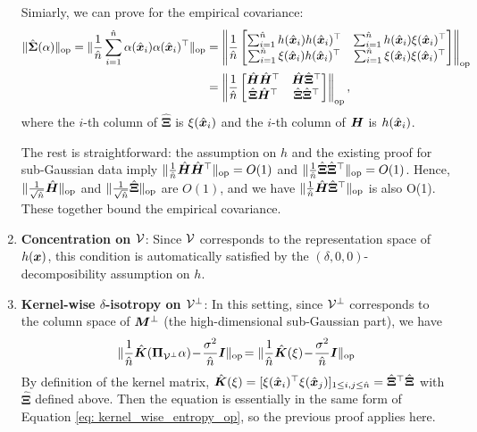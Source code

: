 \begin{enumerate}
        Simiarly, we can prove for the empirical covariance: 
        \begin{align*}
            \lVert \hat{{\bm{\Sigma}}}(\alpha) \rVert_{\mathrm{op}} = \lVert \frac{1}{\hat{n}} \sum_{i=1}^{\hat{n}}\alpha(\hat{{\bm{x}}}_i)\alpha(\hat{{\bm{x}}}_i)^\top  \rVert_{\mathrm{op}} & = \left\|\frac{1}{\hat{n}}\begin{bmatrix}
\sum_{i=1}^{\hat{n}}h(\hat{{\bm{x}}}_i)h(\hat{{\bm{x}}}_i)^\top & \sum_{i=1}^{\hat{n}}h(\hat{{\bm{x}}}_i)\xi(\hat{{\bm{x}}}_i)^\top \\ \sum_{i=1}^{\hat{n}}\xi(\hat{{\bm{x}}}_i)h(\hat{{\bm{x}}}_i)^\top & \sum_{i=1}^{\hat{n}}\xi(\hat{{\bm{x}}}_i)\xi(\hat{{\bm{x}}}_i)^\top
            \end{bmatrix}\right\|_{\text{op}} \\
            & = \left\|\frac{1}{\hat{n}}\begin{bmatrix}
\hat{{\bm{H}}}\hat{{\bm{H}}}^\top & \hat{{\bm{H}}}\hat{\mathbf{\Xi}}^\top \\ \hat{\mathbf{\Xi}}\hat{{\bm{H}}}^\top & \hat{\mathbf{\Xi}}\hat{\mathbf{\Xi}}^\top
            \end{bmatrix}\right\|_{\text{op}}, 
        \end{align*}
where the $i$-th column of $\hat{\mathbf{\Xi}}$ is $\xi(\hat{{\bm{x}}}_i)$ and the $i$-th column of ${\bm{H}}$ is $h(\hat{{\bm{x}}}_i)$. 

The rest is straightforward: the assumption on $h$ and the existing proof for sub-Gaussian data imply $\lVert \frac{1}{\hat{n}}\hat{{\bm{H}}}\hat{{\bm{H}}}^\top \rVert_{\mathrm{op}} = O(1)$ and $\lVert \frac{1}{\hat{n}}\hat{\mathbf{\Xi}}\hat{\mathbf{\Xi}}^\top \rVert_{\mathrm{op}} = O(1)$. Hence, $\lVert \frac{1}{\sqrt{\hat{n}}} \hat{{\bm{H}}} \rVert_{\mathrm{op}}$ and $\lVert \frac{1}{\sqrt{\hat{n}}} \hat{\mathbf{\Xi}} \rVert_{\mathrm{op}}$ are $O(1)$, and we have $\lVert \frac{1}{\hat{n}} \hat{{\bm{H}}}\hat{\mathbf{\Xi}}^\top \rVert_{\mathrm{op}}$ is also O(1). These together bound the empirical covariance. 

        \item \textbf{Concentration on ${\mathcal{V}}$}: Since ${\mathcal{V}}$ corresponds to the representation space of $h({\bm{x}})$, this condition is automatically satisfied by the $(\delta, 0, 0)$-decomposibility assumption on $h$. 
        
        \item \textbf{Kernel-wise $\delta$-isotropy on ${\mathcal{V}}^\perp$}: In this setting, since ${\mathcal{V}}^\perp$ corresponds to the column space of ${\bm{M}}^\perp$ (the high-dimensional sub-Gaussian part), we have
        \[
            \lVert \frac{1}{\hat{n}} \hat{{\bm{K}}}( {\bm{\Pi}}_{{\mathcal{V}}^\perp}\alpha )\! -\!\frac{\sigma^2}{\hat{n}} {\bm{I}}  \rVert_{\mathrm{op}}\! = \lVert \frac{1}{\hat{n}} \hat{{\bm{K}}}(\xi)\! -\!\frac{\sigma^2}{\hat{n}} {\bm{I}}  \rVert_{\mathrm{op}}\!
        \]
        By definition of the kernel matrix, $\hat{{\bm{K}}}(\xi) = [ \xi(\hat{{\bm{x}}}_i)^\top \xi(\hat{{\bm{x}}}_j) ]_{1\leq i,j\leq \hat{n}} = \hat{\mathbf{\Xi}}^\top\hat{\mathbf{\Xi}}$ with $\hat{\mathbf{\Xi}}$ defined above. Then the equation is essentially in the same form of Equation \ref{eq: kernel_wise_entropy_op}, so the previous proof applies here. 
        

\end{enumerate}

